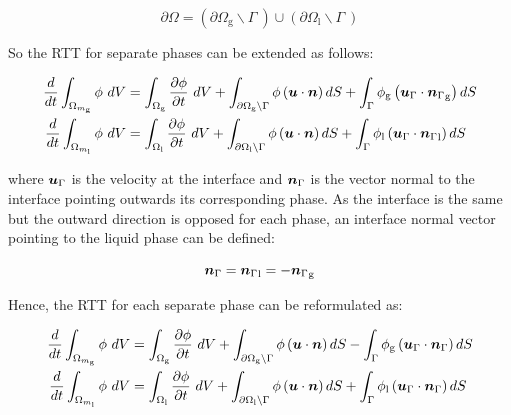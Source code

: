 \begin{equation}
\label{eq:partial_omega_boundaries_partition}
\partial \Omega = \left( \partial \Omega_\mathrm{g} \backslash \Gamma ~ \right) \cup \left( \partial \Omega_\mathrm{l} \backslash \Gamma ~ \right)
\end{equation}

So the RTT for separate phases can be extended as follows:


\begin{subequations}
\begin{align}
\frac{d}{dt} \int_{\Omega_{m_\mathrm{g}}} \phi ~ dV &=  \int_{\Omega_\mathrm{g}} \frac{\partial \phi}{\partial t} ~ dV + \int_{\partial \Omega_\mathrm{g} \backslash \Gamma} \phi \left( \boldsymbol{u} \cdot \boldsymbol{n} \right) dS + \int_{\Gamma} \phi_\mathrm{g} \left( \boldsymbol{u}_{\scriptsize{\Gamma}} \cdot {\boldsymbol{n}_{\scriptsize{\Gamma}}}_\mathrm{g} \right) dS \\
\frac{d}{dt} \int_{\Omega_{m_\mathrm{l}}} \phi ~ dV &=  \int_{\Omega_\mathrm{l}} \frac{\partial \phi}{\partial t} ~ dV + \int_{\partial \Omega_\mathrm{l} \backslash \Gamma} \phi \left( \boldsymbol{u} \cdot \boldsymbol{n} \right) dS + \int_{\Gamma} \phi_\mathrm{l} \left( \boldsymbol{u}_{\scriptsize{\Gamma}} \cdot {\boldsymbol{n}_{\scriptsize{\Gamma}}}_\mathrm{l} \right) dS
\end{align}
\end{subequations}

where $\boldsymbol{u}_{\scriptsize{\Gamma}}$ is the velocity at the interface and $\boldsymbol{n}_{\scriptsize{\Gamma}}$ is the vector normal to the interface pointing outwards its corresponding phase. As the interface is the same but the outward direction is opposed for each phase, an interface normal vector pointing to the liquid phase can be defined: 

\begin{equation}
\boldsymbol{n}_{\scriptsize{\Gamma}} = {\boldsymbol{n}_{\scriptsize{\Gamma}}}_\mathrm{l} = - {\boldsymbol{n}_{\scriptsize{\Gamma}}}_\mathrm{g}
\end{equation}

Hence, the RTT for each separate phase can be reformulated as:

\begin{subequations}
\label{eq:RTT_general_twoEquations}
\begin{align}
\frac{d}{dt} \int_{\Omega_{m_\mathrm{g}}} \phi ~ dV &=  \int_{\Omega_\mathrm{g}} \frac{\partial \phi}{\partial t} ~ dV + \int_{\partial \Omega_\mathrm{g} \backslash \Gamma} \phi \left( \boldsymbol{u} \cdot \boldsymbol{n} \right) dS - \int_{\Gamma} \phi_\mathrm{g} \left( \boldsymbol{u}_{\scriptsize{\Gamma}} \cdot \boldsymbol{n}_{\scriptsize{\Gamma}} \right) dS \\
\frac{d}{dt} \int_{\Omega_{m_\mathrm{l}}} \phi ~ dV &=  \int_{\Omega_\mathrm{l}} \frac{\partial \phi}{\partial t} ~ dV + \int_{\partial \Omega_\mathrm{l} \backslash \Gamma} \phi \left( \boldsymbol{u} \cdot \boldsymbol{n} \right) dS + \int_{\Gamma} \phi_\mathrm{l} \left( \boldsymbol{u}_{\scriptsize{\Gamma}} \cdot \boldsymbol{n}_{\scriptsize{\Gamma}}\right) dS
\end{align}
\end{subequations}

